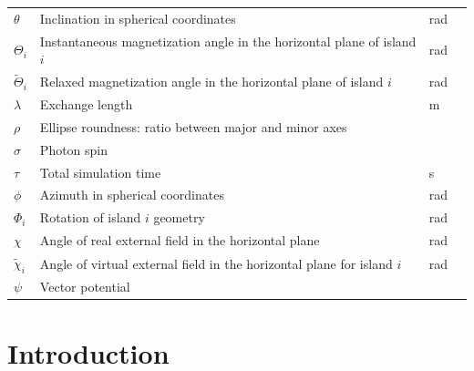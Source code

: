 \documentclass[11pt,a4paper,english]{article}
\begin{document}
\begin{longtable}{llll}
$\theta$ & Inclination in spherical coordinates & \si{\radian} \\
$\Theta_i$ & Instantaneous magnetization angle in the horizontal plane of island $i$ & \si{\radian} \\
$\widetilde{\Theta}_i$ & Relaxed magnetization angle in the horizontal plane of island $i$ & \si{\radian} \\
$\lambda$ & Exchange length & \si{\metre} \\
$\rho$ & Ellipse roundness: ratio between major and minor axes &  \\
$\sigma$ & Photon spin & \si{} \\
$\tau$ & Total simulation time & \si{\second} \\
$\phi$ & Azimuth in spherical coordinates & \si{\radian} \\
$\Phi_i$ & Rotation of island $i$ geometry & \si{\radian} \\
$\chi$ & Angle of real external field in the horizontal plane & \si{\radian} \\
$\widetilde{\chi}_i$ & Angle of virtual external field in the horizontal plane for island $i$ & \si{\radian} \\
$\psi$ & Vector potential & \\
\bottomrule
\end{longtable}



\clearpage
{}
\section{Introduction}
\end{document}
